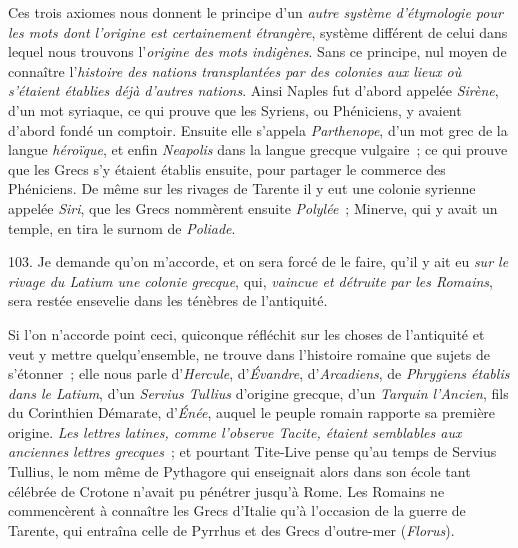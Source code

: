 \documentclass[french,twoside]{book} %
\begin{document}
Ces trois axiomes nous donnent le principe d’un {\itshape autre système d’étymologie pour les mots dont l’origine est certainement étrangère}, système différent de celui dans lequel nous trouvons l’{\itshape origine des mots indigènes}. Sans ce principe, nul moyen de connaître l’{\itshape histoire des nations transplantées par des colonies aux lieux où s’étaient établies déjà d’autres nations}. Ainsi Naples fut d’abord appelée {\itshape Sirène}, d’un mot syriaque, ce qui prouve que les Syriens, ou Phéniciens, y avaient d’abord fondé un comptoir. Ensuite elle s’appela {\itshape Parthenope}, d’un mot grec de la langue {\itshape héroïque}, et enfin {\itshape Neapolis} dans la langue grecque vulgaire ; ce qui prouve que les  Grecs s’y étaient établis ensuite, pour partager le commerce des Phéniciens. De même sur les rivages de Tarente il y eut une colonie syrienne appelée {\itshape Siri}, que les Grecs nommèrent ensuite {\itshape Polylée} ; Minerve, qui y avait un temple, en tira le surnom de {\itshape Poliade}.\par
103. Je demande qu’on m’accorde, et on sera forcé de le faire, qu’il y ait eu {\itshape sur le rivage du Latium une colonie grecque}, qui, {\itshape vaincue et détruite par les Romains}, sera restée ensevelie dans les ténèbres de l’antiquité.\par
Si l’on n’accorde point ceci, quiconque réfléchit sur les choses de l’antiquité et veut y mettre quelqu’ensemble, ne trouve dans l’histoire romaine que sujets de s’étonner ; elle nous parle d’{\itshape Hercule}, d’{\itshape Évandre}, d’{\itshape Arcadiens}, de {\itshape Phrygiens établis dans le Latium}, d’un {\itshape Servius Tullius} d’origine grecque, d’un {\itshape Tarquin l’Ancien}, fils du Corinthien Démarate, d’{\itshape Énée}, auquel le peuple romain rapporte sa première origine. \emph{{\itshape Les lettres latines}, comme l’observe Tacite, {\itshape  étaient semblables aux anciennes lettres grecques}} ; et pourtant Tite-Live pense qu’au temps de Servius Tullius, le nom même de Pythagore qui enseignait alors dans son école tant célébrée de Crotone n’avait pu pénétrer jusqu’à Rome. Les Romains ne commencèrent à connaître les Grecs d’Italie qu’à l’occasion de la guerre de Tarente, qui entraîna celle de Pyrrhus et des Grecs d’outre-mer ({\itshape Florus}).
\end{document}
